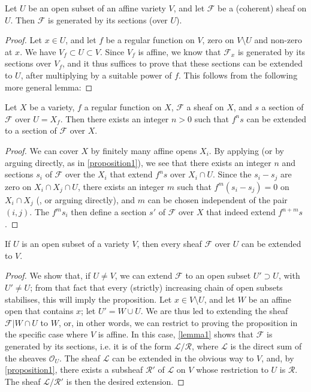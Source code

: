 \documentclass{article}
\theoremstyle{plain}
\newenvironment{proposition}[1]
    {\renewcommand\theinnercustomproposition{#1}\innercustomproposition}
    {\endinnercustomproposition}
\newenvironment{lemma}[1]
    {\renewcommand\theinnercustomlemma{#1}\innercustomlemma}
    {\endinnercustomlemma}
\theoremstyle{definition}
\newcommand{\sh}[1]{{\mathscr{#1}}}
\newcommand{\oldpage}[1]{\marginpar{\footnotesize$\Big\vert$ \textit{p.~#1}}}
\begin{document}
\begin{lemma}{1}
\label{lemma1}
  Let $U$ be an open subset of an affine variety $V$, and let $\sh{F}$ be a (coherent) sheaf on $U$.
  Then $\sh{F}$ is generated by its sections (over $U$).
\end{lemma}

\begin{proof}
  Let $x\in U$, and let $f$ be a regular function on $V$, zero on $V\setminus U$ and non-zero at $x$.
  We have $V_f\subset U\subset V$.
  Since $V_f$ is affine, we know \cite{12} that $\sh{F}_x$ is generated by its sections over $V_f$, and it thus suffices to prove that these sections can be extended to $U$, after multiplying by a suitable power of $f$.
  This follows from the following more general lemma:
\end{proof}

\begin{lemma}{2}
\label{lemma2}
  Let $X$ be a variety, $f$ a regular function on $X$, $\sh{F}$ a sheaf on $X$, and $s$ a section of $\sh{F}$ over $U=X_f$.
  Then there exists an integer $n>0$ such that $f^ns$ can be extended to a section of $\sh{F}$ over $X$.
\end{lemma}

\begin{proof}
  We can cover $X$ by finitely many affine opens $X_i$.
  By applying \cite[lemma~1, p.~247]{12} (or by arguing directly, as in \cref{proposition1}), we see that there exists an integer $n$ and sections $s_i$ of $\sh{F}$ over the $X_i$ that extend $f^ns$ over $X_i\cap U$.
  Since the $s_i-s_j$ are zero on $X_i\cap X_j\cap U$, there exists an integer $m$ such that $f^m(s_i-s_j)=0$ on $X_i\cap X_j$ (\cite[p.~235]{12}, or arguing directly), and $m$ can be chosen independent of the pair $(i,j)$.
  The $f^ms_i$ then define a section $s'$ of $\sh{F}$ over $X$ that indeed extend $f^{n+m}s$.
\end{proof}

\begin{proposition}{2}
\label{proposition2}
\oldpage{99}
  If $U$ is an open subset of a variety $V$, then every sheaf $\sh{F}$ over $U$ can be extended to $V$.
\end{proposition}

\begin{proof}
  We show that, if $U\neq V$, we can extend $\sh{F}$ to an open subset $U'\supset U$, with $U'\neq U$;
  from that fact that every (strictly) increasing chain of open subsets stabilises, this will imply the proposition.
  Let $x\in V\setminus U$, and let $W$ be an affine open that contains $x$;
  let $U'=W\cup U$.
  We are thus led to extending the sheaf $\sh{F}|W\cap U$ to $W$, or, in other words, we can restrict to proving the proposition in the specific case where $V$ is affine.
  In this case, \cref{lemma1} shows that $\sh{F}$ is generated by its sections, i.e. it is of the form $\sh{L}/\sh{R}$, where $\sh{L}$ is the direct sum of the sheaves $\sh{O}_U$.
  The sheaf $\sh{L}$ can be extended in the obvious way to $V$, and, by \cref{proposition1}, there exists a subsheaf $\sh{R}'$ of $\sh{L}$ on $V$ whose restriction to $U$ is $\sh{R}$.
  The sheaf $\sh{L}/\sh{R}'$ is then the desired extension.
\end{proof}
\end{document}
